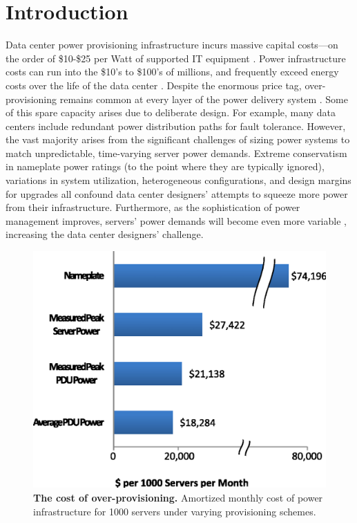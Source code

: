 \section{Introduction}

Data center power provisioning infrastructure incurs massive capital costs---on the order of \$10-\$25 per Watt of supported IT equipment \cite{BarrosoBook09,Turner06}. Power infrastructure costs can run into the \$10's to \$100's of millions, and frequently exceed energy costs over the life of the data center \cite{Hamilton09}.  Despite the enormous price tag, over-provisioning remains common at every layer of the power delivery system \cite{Hamilton09, BarrosoBook09,Fan07,Lefurgy08,Ranganathan06,Govindan09}.  Some of this spare capacity arises due to deliberate design.  For example, many data centers include redundant power distribution paths for fault tolerance.  However, the vast majority arises from the significant challenges of sizing power systems to match unpredictable, time-varying server power demands. Extreme conservatism in nameplate power ratings (to the point where they are typically ignored), variations in system utilization, heterogeneous configurations, and design margins for upgrades all confound data center designers' attempts to squeeze more power from their infrastructure.  Furthermore, as the sophistication of power management improves, servers' power demands will become even more variable \cite{Meisner09}, increasing the data center designers' challenge.

\begin{figure}[t!]
\centering
\includegraphics[width = 3.0 in]{Appendices/PowerRouting/figure/intro.eps}
\vspace{-.05 in}
\caption{ \textbf{The cost of over-provisioning.} \textnormal{Amortized monthly cost of power infrastructure for 1000 servers under varying provisioning schemes.}}
\label{figure::intro}
\vspace{-.1 in}
\end{figure}

